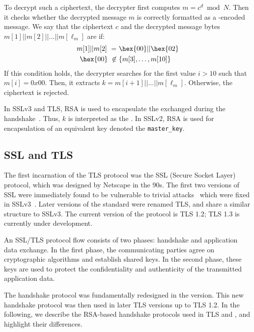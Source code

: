 To decrypt such a ciphertext, the decrypter first computes $m = c^d
\bmod N$.  Then it checks whether the decrypted message $m$ is
correctly formatted as a \PKCS-encoded message. We say that the
ciphertext $c$ and the decrypted message bytes $m{[1]} || m{[2]} || ... ||
m{[\ell_m]}$ are \PKCSconform if:
\begin{equation*} 
	\begin{split} 
		m{[1]}||m{[2]} \text{ } = &\text{ } \hex{00} || \hex{02}\\
		\hex{00} \text{ } \not \in &\text{ } \{m{[3]}, \ldots,m{[10]}\}\\ 
	\end{split}
\end{equation*} 
If this condition holds, the decrypter searches for the first value
$i>10$ such that $m{[i]}=0x00$. Then, it extracts $k =
m{[i+1]}||\ldots||m{[\ell_m]}$. Otherwise, the ciphertext is rejected.

In SSLv3 and TLS, RSA \PKCS is used to encapsulate the
\pms exchanged during the
handshake~\cite{rfc5246}. Thus, $k$ is interpreted as the
\pms.  In SSLv2, RSA \PKCS is used for
encapsulation of an equivalent key denoted the \texttt{master\_key}.


\subsection{SSL and TLS}
The first incarnation of the TLS protocol was the SSL (Secure Socket
Layer) protocol, which was designed by Netscape in the 90s. The first two
versions of SSL were immediately found to be vulnerable to trivial
attacks~\cite{ProhibitingSSLv2,ssl-v3-1996} which 
were fixed in SSLv3~\cite{SSLv3}.  Later versions of
the standard were renamed TLS, and share a similar structure to SSLv3.
The current version of the protocol is TLS 1.2; TLS 1.3 is currently
under development.

An SSL/TLS protocol flow consists of two phases: handshake and
application data exchange. In the first phase, the communicating
parties agree on cryptographic algorithms and establish shared
keys. In the second phase, these keys are used to protect the
confidentiality and authenticity of the transmitted application data.

The handshake protocol was fundamentally redesigned in the \sslthree
version. This new handshake protocol was then used in later TLS
versions up to TLS 1.2. In the following, we describe the RSA-based
handshake protocols used in TLS and \ssltwo, and highlight their
differences.

